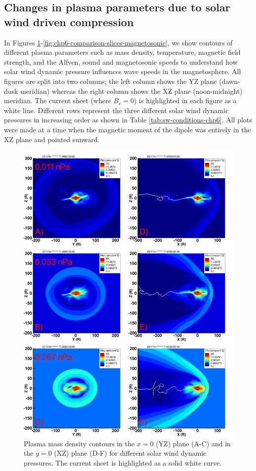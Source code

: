 \subsection{Changes in plasma parameters due to solar wind driven compression}

In Figures \ref{fig:chp6-comparison-slices-density}-\ref{fig:chp6-comparison-slices-magnetosonic}, we show contours of different plasma parameters such as mass density, temperature, magnetic field strength, and the Alfven, sound and magnetosonic speeds to understand how solar wind dynamic pressure influences wave speeds in the magnetosphere. All figures are split into two columns; the left column shows the YZ plane (dawn-dusk meridian) whereas the right column shows the XZ plane (noon-midnight) meridian. The current sheet (where $B_r=0$) is highlighted in each figure as a white line. Different rows represent the three different solar wind dynamic pressures in increasing order as shown in Table \ref{tab:sw-conditions-chp6}. All plots were made at a time when the magnetic moment of the dipole was entirely in the XZ plane and pointed sunward. 

\begin{figure}
    \centering
    \includegraphics[height=0.9\textheight]{images6/compare_runs_currentsheet_Density.png}
    \caption{Plasma mass density contours in the $x=0$ (YZ) plane (A-C) and in the $y=0$ (XZ) plane (D-F) for different solar wind dynamic pressures. The current sheet is highlighted as a solid white curve.}
    \label{fig:chp6-comparison-slices-density}
\end{figure}

